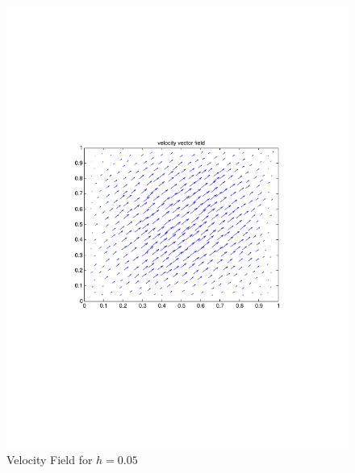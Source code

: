 \documentclass[12pt]{article}
\begin{document}
                \begin{figure}[htb]
                    \begin{center}
                \includegraphics[scale=0.50]{./../files/box/2q.pdf}
                \caption{Velocity Field for $h = 0.05$}
            \end{center}
            \end{figure}
\end{document}
